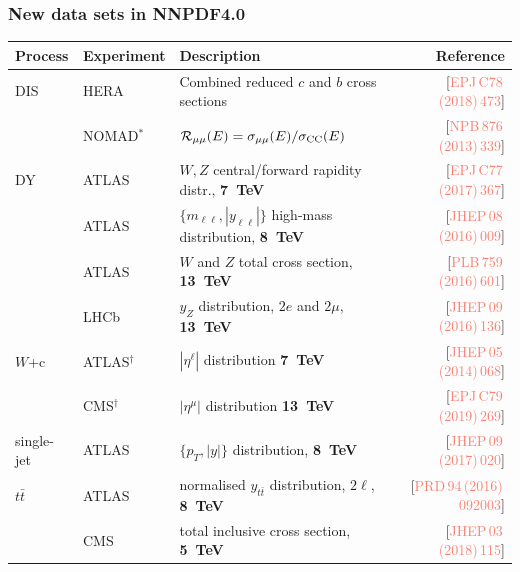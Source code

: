 \documentclass{beamer}
\begin{document}
\begin{frame}
 \frametitle{New data sets in NNPDF4.0}
 \tiny
 \vspace{0.1cm}
 \begin{tabularx}{\textwidth}{llXr}
 \toprule
 Process    & Experiment & Description                                         & Reference\\
 \midrule
 DIS        
            & HERA        & Combined reduced $c$ and $b$ cross sections                      & [{\textcolor{salmon}{EPJ\,C78\,(2018)\,473}}]\\
            & NOMAD$^*$   & $\mathcal{R}_{\mu\mu}(E)=\sigma_{\mu\mu}(E)/\sigma_{\rm CC}(E)$  & [{\textcolor{salmon}{NPB\,876\,(2013)\,339}}]\\
 DY         
            & ATLAS       & $W,Z$ central/forward rapidity distr., {\bf 7~TeV}    & [{\textcolor{salmon}{EPJ\,C77\,(2017)\,367}}]\\
            & ATLAS       & $\{m_{\ell\ell},|y_{\ell\ell}|\}$ high-mass distribution, {\bf 8~TeV} & [{\textcolor{salmon}{JHEP\,08\,(2016)\,009}}]\\
            & ATLAS       & $W$ and $Z$ total cross section, {\bf 13~TeV}                    & [{\textcolor{salmon}{PLB\,759\,(2016)\,601}}]\\
            & LHCb        & $y_Z$ distribution, $2e$ and $2\mu$, {\bf 13~TeV}                & [{\textcolor{salmon}{JHEP\,09\,(2016)\,136}}]\\  
 $W$+c 
            & ATLAS$^\dag$& $|\eta^\ell|$ distribution  {\bf 7~TeV}                          & [{\textcolor{salmon}{JHEP\,05\,(2014)\,068}}]\\
            & CMS$^\dag$  & $|\eta^\mu|$ distribution  {\bf 13~TeV}                          & [{\textcolor{salmon}{EPJ\,C79\,(2019)\,269}}]\\ 
 single-jet 
            & ATLAS       & $\{p_T, |y|\}$ distribution, {\bf 8~TeV}                         & [{\textcolor{salmon}{JHEP\,09\,(2017)\,020}}]\\
 $t\bar{t}$ 
            & ATLAS       & normalised $y_{t\bar{t}}$ distribution, $2\ell$, {\bf 8~TeV}     & [{\textcolor{salmon}{PRD\,94\,(2016)\,092003}}]\\
            & CMS         & total inclusive cross section, {\bf 5~TeV}                       & [{\textcolor{salmon}{JHEP\,03\,(2018)\,115}}]\\

\end{tabularx}
\end{frame}
\end{document}

